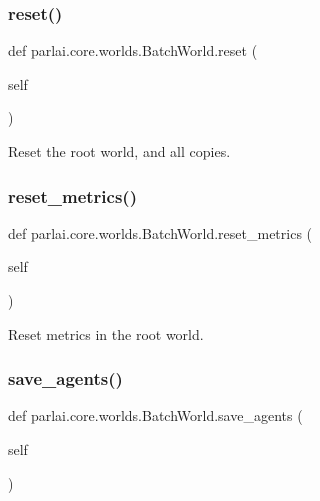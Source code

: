 \subsubsection{\texorpdfstring{reset()}{reset()}}
{\footnotesize\ttfamily def parlai.\+core.\+worlds.\+Batch\+World.\+reset (\begin{DoxyParamCaption}\item[{}]{self }\end{DoxyParamCaption})}

\begin{DoxyVerb}Reset the root world, and all copies.
\end{DoxyVerb}
 \mbox{\label{classparlai_1_1core_1_1worlds_1_1BatchWorld_a16a31209d87f0f9bf27871110bd63aa6}} 
\subsubsection{\texorpdfstring{reset\+\_\+metrics()}{reset\_metrics()}}
{\footnotesize\ttfamily def parlai.\+core.\+worlds.\+Batch\+World.\+reset\+\_\+metrics (\begin{DoxyParamCaption}\item[{}]{self }\end{DoxyParamCaption})}

\begin{DoxyVerb}Reset metrics in the root world.
\end{DoxyVerb}
 \mbox{\label{classparlai_1_1core_1_1worlds_1_1BatchWorld_a84ee0ac53e07cbfc9bdb8a978a8df7e1}} 
\subsubsection{\texorpdfstring{save\+\_\+agents()}{save\_agents()}}
{\footnotesize\ttfamily def parlai.\+core.\+worlds.\+Batch\+World.\+save\+\_\+agents (\begin{DoxyParamCaption}\item[{}]{self }\end{DoxyParamCaption})}


